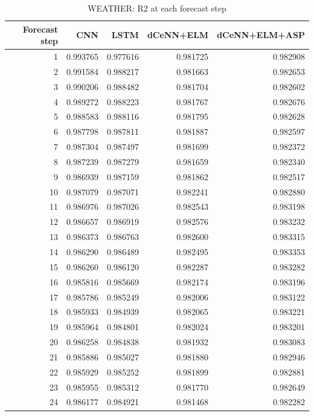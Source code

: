 \begin{table}
\caption{WEATHER: R2 at each forecast step}
\begin{tabular}{rrrrr}
\toprule
Forecast step & CNN & LSTM & dCeNN+ELM & dCeNN+ELM+ASP \\
\midrule
1 & 0.993765 & 0.977616 & 0.981725 & 0.982908 \\
2 & 0.991584 & 0.988217 & 0.981663 & 0.982653 \\
3 & 0.990206 & 0.988482 & 0.981704 & 0.982602 \\
4 & 0.989272 & 0.988223 & 0.981767 & 0.982676 \\
5 & 0.988583 & 0.988116 & 0.981795 & 0.982628 \\
6 & 0.987798 & 0.987811 & 0.981887 & 0.982597 \\
7 & 0.987304 & 0.987497 & 0.981699 & 0.982372 \\
8 & 0.987239 & 0.987279 & 0.981659 & 0.982340 \\
9 & 0.986939 & 0.987159 & 0.981862 & 0.982517 \\
10 & 0.987079 & 0.987071 & 0.982241 & 0.982880 \\
11 & 0.986976 & 0.987026 & 0.982543 & 0.983198 \\
12 & 0.986657 & 0.986919 & 0.982576 & 0.983232 \\
13 & 0.986373 & 0.986763 & 0.982600 & 0.983315 \\
14 & 0.986290 & 0.986489 & 0.982495 & 0.983353 \\
15 & 0.986260 & 0.986120 & 0.982287 & 0.983282 \\
16 & 0.985816 & 0.985669 & 0.982174 & 0.983196 \\
17 & 0.985786 & 0.985249 & 0.982006 & 0.983122 \\
18 & 0.985933 & 0.984939 & 0.982065 & 0.983221 \\
19 & 0.985964 & 0.984801 & 0.982024 & 0.983201 \\
20 & 0.986258 & 0.984838 & 0.981932 & 0.983083 \\
21 & 0.985886 & 0.985027 & 0.981880 & 0.982946 \\
22 & 0.985929 & 0.985252 & 0.981899 & 0.982881 \\
23 & 0.985955 & 0.985312 & 0.981770 & 0.982649 \\
24 & 0.986177 & 0.984921 & 0.981468 & 0.982282 \\
\bottomrule
\end{tabular}
\end{table}

